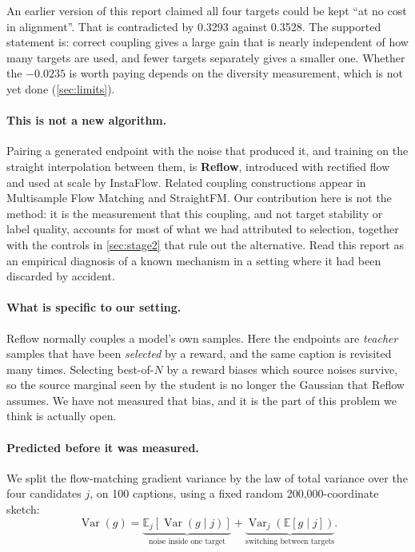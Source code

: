 \documentclass[11pt]{article}
\newcommand{\obs}[1]{\textcolor{obsblue}{#1}}
\begin{document}
An earlier version of this report claimed all four targets could be kept ``at no cost in
alignment''. That is contradicted by \obs{0.3293} against \obs{0.3528}. The supported statement is:
correct coupling gives a large gain that is nearly independent of how many targets are used, and
fewer targets separately gives a smaller one. Whether the \obs{$-0.0235$} is worth paying depends on
the diversity measurement, which is not yet done (\cref{sec:limits}).

\paragraph{This is not a new algorithm.}
Pairing a generated endpoint with the noise that produced it, and training on the straight
interpolation between them, is \textbf{Reflow}, introduced with rectified flow and used at scale by
InstaFlow. Related coupling constructions appear in Multisample Flow Matching and StraightFM. Our
contribution here is not the method: it is the measurement that this coupling, and not target
stability or label quality, accounts for most of what we had attributed to selection, together with
the controls in \cref{sec:stage2} that rule out the alternative. Read this report as an empirical
diagnosis of a known mechanism in a setting where it had been discarded by accident.

\paragraph{What is specific to our setting.}
Reflow normally couples a model's own samples. Here the endpoints are \emph{teacher} samples that
have been \emph{selected} by a reward, and the same caption is revisited many times. Selecting
best-of-$N$ by a reward biases which source noises survive, so the source marginal seen by the
student is no longer the Gaussian that Reflow assumes. We have not measured that bias, and it is
the part of this problem we think is actually open.

\paragraph{Predicted before it was measured.}
We split the flow-matching gradient variance by the law of total variance over the four candidates
$j$, on \obs{100} captions, using a fixed random \obs{200{,}000}-coordinate sketch:
\begin{equation}
  \operatorname{Var}(g)=\underbrace{\mathbb E_j\!\left[\operatorname{Var}(g\mid j)\right]}_{\text{noise inside one target}}
  +\underbrace{\operatorname{Var}_j\!\left(\mathbb E[g\mid j]\right)}_{\text{switching between targets}} .
\label{eq:varsplit}
\end{equation}
\end{document}
